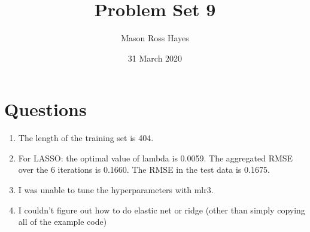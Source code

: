 \documentclass{article}
\title{Problem Set 9}
\author{Mason Ross Hayes}
\date{31 March 2020}
\begin{document}
\maketitle


\section{Questions}

\begin{enumerate}
    \item The length of the training set is 404.
    \item For LASSO: the optimal value of lambda is 0.0059. The aggregated RMSE over the 6 iterations is 0.1660. The RMSE in the test data is 0.1675.
    \item I was unable to tune the hyperparameters with mlr3.
    \item I couldn't figure out how to do elastic net or ridge (other than simply copying all of the example code)
\end{enumerate}
\end{document}
